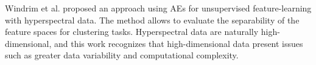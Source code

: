 \documentclass[journal,article,submit,pdftex,moreauthors]{Definitions/mdpi}
\begin{document}

Windrim et al. \cite{Windrim2019} proposed an approach using AEs for unsupervised feature-learning with hyperspectral data. The method allows to evaluate the separability of the feature spaces for clustering tasks. Hyperspectral data are naturally high-dimensional, and this work recognizes that high-dimensional data present issues such as greater data variability and computational complexity. 
\end{document}
